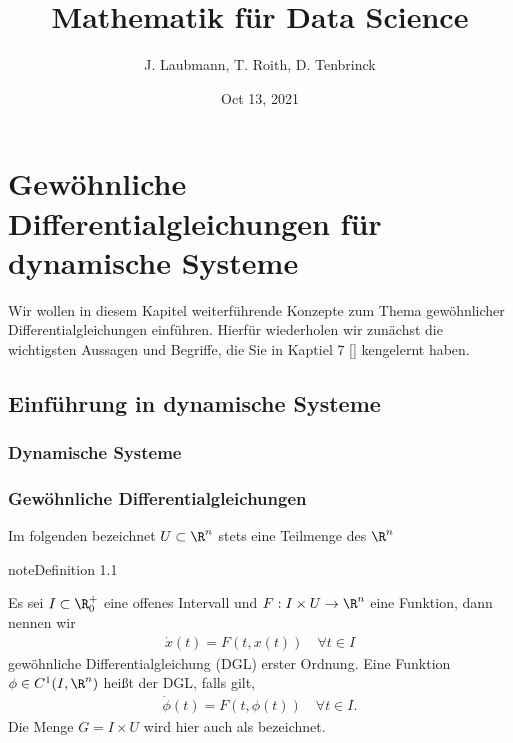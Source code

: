 \documentclass[letterpaper,10pt,english]{jupyterBook}
\title{Mathematik für Data Science}
\date{Oct 13, 2021}
\author{J.\@{} Laubmann, T.\@{} Roith, D.\@{} Tenbrinck}
\begin{document}
\pagestyle{empty}
\sphinxmaketitle
\pagestyle{plain}
\sphinxtableofcontents
\pagestyle{normal}
\label{\detokenize{intro::doc}}



\chapter{Gewöhnliche Differentialgleichungen für dynamische Systeme}
\label{\detokenize{ode/ode:gewohnliche-differentialgleichungen-fur-dynamische-systeme}}\label{\detokenize{ode/ode::doc}}
Wir wollen in diesem Kapitel weiterführende Konzepte zum Thema gewöhnlicher Differentialgleichungen einführen. Hierfür wiederholen wir zunächst die wichtigsten Aussagen und Begriffe, die Sie in Kaptiel 7 {[}{]} kengelernt haben.


\section{Einführung in dynamische Systeme}
\label{\detokenize{ode/motivation:einfuhrung-in-dynamische-systeme}}\label{\detokenize{ode/motivation::doc}}

\subsection{Dynamische Systeme}
\label{\detokenize{ode/motivation:dynamische-systeme}}

\subsection{Gewöhnliche Differentialgleichungen}
\label{\detokenize{ode/motivation:gewohnliche-differentialgleichungen}}
Im folgenden bezeichnet \(U\subset\R^n\) stets eine  Teilmenge des \(\R^n\)
\label{ode/motivation:def:DGL}
\begin{sphinxadmonition}{note}{Definition 1.1}



Es sei \(I\subset\R^+_0\) eine offenes Intervall und \(F:I\times U\rightarrow\R^n\) eine  Funktion, dann nennen wir
\begin{equation}\label{equation:ode/motivation:eq:DGL}
\begin{split}\dot{x}(t) = F(t, x(t))\quad\forall t\in I\end{split}
\end{equation}
gewöhnliche Differentialgleichung (DGL) erster Ordnung. Eine Funktion \(\phi\in C^1(I,\R^n)\) heißt  der DGL, falls gilt,
\begin{equation*}
\begin{split}\dot{\phi}(t) = F(t, \phi(t))\quad\forall t\in I.\end{split}
\end{equation*}
Die Menge \(G=I\times U\) wird hier auch als  bezeichnet.
\end{sphinxadmonition}
\end{document}

